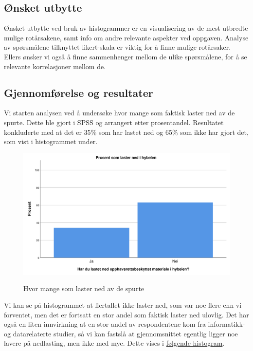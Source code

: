 \subsection{Ønsket utbytte}
Ønsket utbytte ved bruk av histogrammer er en visualisering av de mest utbredte mulige rotårsakene, samt info om andre relevante aspekter ved oppgaven. Analyse av spørsmålene tilknyttet likert-skala er viktig for å finne mulige rotårsaker. Ellers ønsker vi også å finne sammenhenger mellom de ulike spørsmålene, for å se relevante korrelasjoner mellom de.


\subsection{Gjennomførelse og resultater}
Vi starten analysen ved å undersøke hvor mange som faktisk laster ned av de spurte. Dette ble gjort i SPSS og arrangert etter prosentandel. Resultatet konkluderte med at det er 35\% som har lastet ned og 65\% som ikke har gjort det, som vist i histogrammet under.

\begin{figure}[H]
    \centering
    \includegraphics[scale=0.45]{case_1/bilder/lasterned.pdf}
    \label{fig:lasterned}
    \caption[Laster ned]{Hvor mange som laster ned av de spurte}
\end{figure}

Vi kan se på histogrammet at flertallet ikke laster ned, som var noe flere enn vi forventet, men det er fortsatt en stor andel som faktisk laster ned ulovlig. Det har også en liten innvirkning at en stor andel av respondentene kom fra informatikk- og datarelaterte studier, så vi kan fastslå at gjennomsnittet egentlig ligger noe lavere på nedlasting, men ikke med mye. Dette vises i \hyperref[fig:IT-lasterned]{følgende histogram}.

